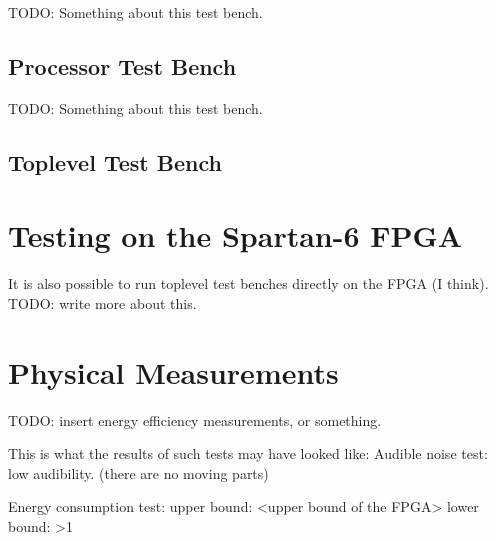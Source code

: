 TODO: Something about this test bench.

\subsection{Processor Test Bench}

TODO: Something about this test bench.

\subsection{Toplevel Test Bench}



\section{Testing on the Spartan-6 FPGA}

It is also possible to run toplevel test benches directly on the FPGA (I think).
TODO: write more about this.

\section{Physical Measurements}

TODO: insert energy efficiency measurements, or something.

This is what the results of such tests may have looked like:
Audible noise test: low audibility. (there are no moving parts)

Energy consumption test:
upper bound: <upper bound of the FPGA>
lower bound: >1 


